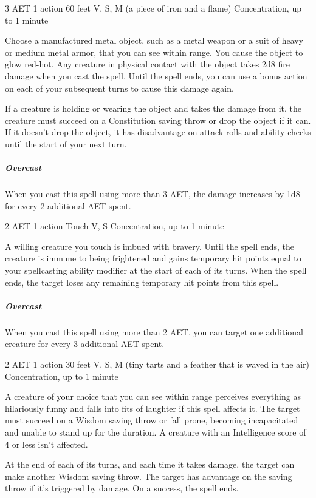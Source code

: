 \label{spell:heat-metal}
{3 AET}
{1 action}
{60 feet}
{V, S, M (a piece of iron and a flame)}
{Concentration, up to 1 minute}

Choose a manufactured metal object, such as a metal weapon or a suit of heavy or medium metal armor, that you can see within range. You cause the object to glow red-hot. Any creature in physical contact with the object takes 2d8 fire damage when you cast the spell. Until the spell ends, you can use a bonus action on each of your subsequent turns to cause this damage again.

If a creature is holding or wearing the object and takes the damage from it, the creature must succeed on a Constitution saving throw or drop the object if it can. If it doesn't drop the object, it has disadvantage on attack rolls and ability checks until the start of your next turn.

\subparagraph*{Overcast} When you cast this spell using more than 3 AET, the damage increases by 1d8 for every 2 additional AET spent.

\label{spell:heroism}
{2 AET}
{1 action}
{Touch}
{V, S}
{Concentration, up to 1 minute}

A willing creature you touch is imbued with bravery. Until the spell ends, the creature is immune to being frightened and gains temporary hit points equal to your spellcasting ability modifier at the start of each of its turns. When the spell ends, the target loses any remaining temporary hit points from this spell.
\subparagraph*{Overcast} When you cast this spell using more than 2 AET, you can target one additional creature for every 3 additional AET spent.

\label{spell:hideous-laughter}
{2 AET}
{1 action}
{30 feet}
{V, S, M (tiny tarts and a feather that is waved in the air)}
{Concentration, up to 1 minute}

A creature of your choice that you can see within range perceives everything as hilariously funny and falls into fits of laughter if this spell affects it. The target must succeed on a Wisdom saving throw or fall prone, becoming incapacitated and unable to stand up for the duration. A creature with an Intelligence score of 4 or less isn't affected.

At the end of each of its turns, and each time it takes damage, the target can make another Wisdom saving throw. The target has advantage on the saving throw if it's triggered by damage. On a success, the spell ends.

